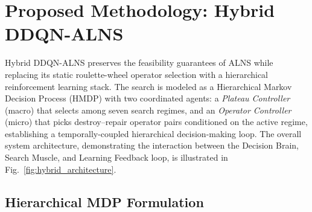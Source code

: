 \documentclass[journal]{IEEEtran}
\begin{document}
\section{Proposed Methodology: Hybrid DDQN-ALNS}
\label{sec:methodology}

Hybrid DDQN-ALNS preserves the feasibility guarantees of ALNS while replacing
its static roulette-wheel operator selection with a hierarchical reinforcement
learning stack.  The search is modeled as a Hierarchical Markov Decision
Process (HMDP) with two coordinated agents: a \emph{Plateau Controller}
(macro) that selects among seven search regimes, and an \emph{Operator Controller}
(micro) that picks destroy--repair operator pairs conditioned on the active
regime, establishing a temporally-coupled hierarchical decision-making loop. The overall system architecture, demonstrating the interaction between the Decision Brain, Search Muscle, and Learning Feedback loop, is illustrated in Fig.~\ref{fig:hybrid_architecture}.

\subsection{Hierarchical MDP Formulation}
\end{document}
